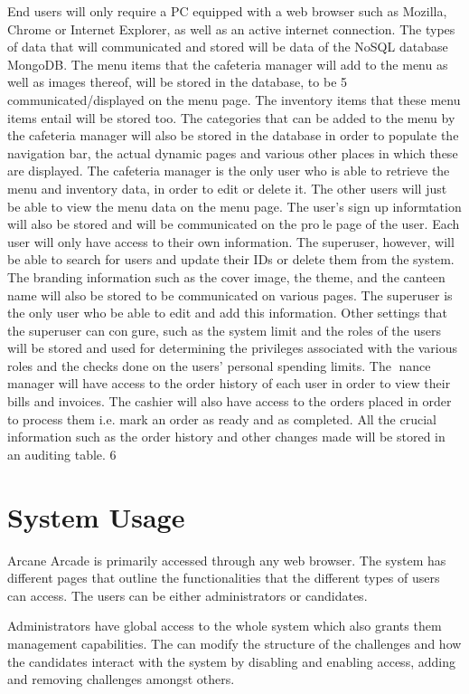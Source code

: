 \documentclass[english]{article}
\begin{document}
	End users will only require a PC equipped with a web browser such as Mozilla,
Chrome or Internet Explorer, as well as an active internet connection. The
types of data that will communicated and stored will be data of the NoSQL
database MongoDB. The menu items that the cafeteria manager will add to
the menu as well as images thereof, will be stored in the database, to be
5
communicated/displayed on the menu page. The inventory items that these
menu items entail will be stored too. The categories that can be added to
the menu by the cafeteria manager will also be stored in the database in
order to populate the navigation bar, the actual dynamic pages and various
other places in which these are displayed. The cafeteria manager is the only
user who is able to retrieve the menu and inventory data, in order to edit
or delete it. The other users will just be able to view the menu data on the
menu page. The user's sign up informtation will also be stored and will be
communicated on the prole page of the user. Each user will only have access
to their own information. The superuser, however, will be able to search for
users and update their IDs or delete them from the system. The branding
information such as the cover image, the theme, and the canteen name will
also be stored to be communicated on various pages. The superuser is the
only user who be able to edit and add this information. Other settings that
the superuser can congure, such as the system limit and the roles of the
users will be stored and used for determining the privileges associated with
the various roles and the checks done on the users' personal spending limits.
The nance manager will have access to the order history of each user in
order to view their bills and invoices. The cashier will also have access to the
orders placed in order to process them i.e. mark an order as ready and as
completed. All the crucial information such as the order history and other
changes made will be stored in an auditing table.
6
	
	
	\section{System Usage}
	Arcane Arcade is primarily accessed through any web browser. The system has different pages that outline the functionalities that the different types of users can access. The users can be either administrators or candidates. 
		
	Administrators have global access to the whole system which also grants them management capabilities. The can modify the structure of the challenges and how the candidates interact with the system by disabling and enabling access, adding and removing challenges amongst others.
		
\end{document}
